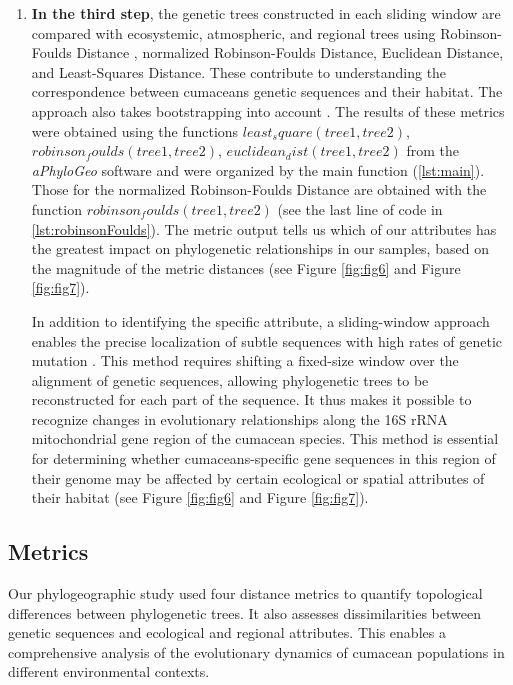 \begin{enumerate}
\item \textbf{In the third step}, the genetic trees constructed in each sliding window are compared with ecosystemic, atmospheric, and regional trees using Robinson-Foulds Distance \citep{robinson_comparison_1981, koshkarov_phylogeography_2022}, normalized Robinson-Foulds Distance, Euclidean Distance, and Least-Squares Distance. These contribute to understanding the correspondence between cumaceans genetic sequences and their habitat. The approach also takes bootstrapping into account \citep{koshkarov_phylogeography_2022}. The results of these metrics were obtained using the functions $least_square(tree1, tree2)$, $robinson_foulds(tree1, tree2)$, $euclidean_dist(tree1, tree2)$ from the \textit{aPhyloGeo} software and were organized by the main function (\autoref{lst:main}). Those for the normalized Robinson-Foulds Distance are obtained with the function $robinson_foulds(tree1, tree2)$ (see the last line of code in \autoref{lst:robinsonFoulds}). The metric output tells us which of our attributes has the greatest impact on phylogenetic relationships in our samples, based on the magnitude of the metric distances (see Figure \ref{fig:fig6} and Figure \ref{fig:fig7}). 

In addition to identifying the specific attribute, a sliding-window approach enables the precise localization of subtle sequences with high rates of genetic mutation \citep{koshkarov_phylogeography_2022}. This method requires shifting a fixed-size window over the alignment of genetic sequences, allowing phylogenetic trees to be reconstructed for each part of the sequence. It thus makes it possible to recognize changes in evolutionary relationships along the 16S rRNA mitochondrial gene region of the cumacean species. This method is essential for determining whether cumaceans-specific gene sequences in this region of their genome may be affected by certain ecological or spatial attributes of their habitat (see Figure \ref{fig:fig6} and Figure \ref{fig:fig7}).
\end{enumerate}

\subsection{Metrics}\label{metrics}
Our phylogeographic study used four distance metrics to quantify topological differences between phylogenetic trees. It also assesses dissimilarities between genetic sequences and ecological and regional attributes. This enables a comprehensive analysis of the evolutionary dynamics of cumacean populations in different environmental contexts. 

